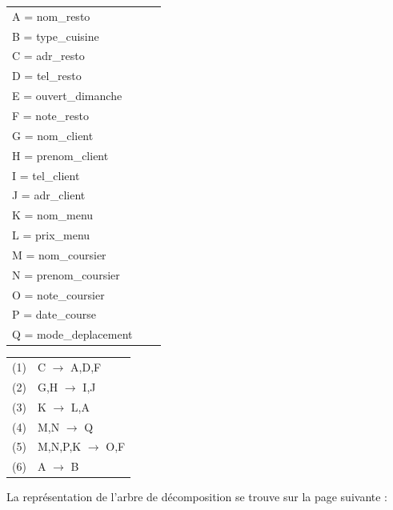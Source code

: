 \documentclass[french]{article}
\begin{document}
 
            \begin{tabular}{lll}
                A = nom\_resto \\
                B = type\_cuisine \\
                C = adr\_resto \\
                D = tel\_resto \\
                E = ouvert\_dimanche \\
                F = note\_resto \\
                G = nom\_client \\
                H = prenom\_client \\
                I = tel\_client \\
                J = adr\_client \\
                K = nom\_menu \\
                L = prix\_menu \\
                M = nom\_coursier \\
                N = prenom\_coursier \\
                O = note\_coursier \\
                P = date\_course \\
                Q = mode\_deplacement \\
            \end{tabular}
            \hfill
            \begin{tabular}{ll}
                (1) & C $\rightarrow$ A,D,F \\
                (2) & G,H $\rightarrow$ I,J \\
                (3) & K $\rightarrow$ L,A \\
                (4) & M,N $\rightarrow$ Q \\
                (5) & M,N,P,K $\rightarrow$ O,F \\
                (6) & A $\rightarrow$ B \\
            \end{tabular}
            \bigskip
            
            La représentation de l'arbre de décomposition se trouve sur la page suivante :\newpage
                
\end{document}
